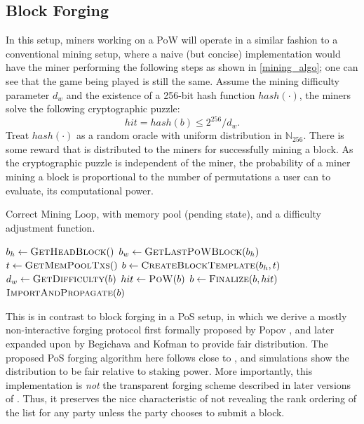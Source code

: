 \documentclass[a4paper]{article}
\begin{document}
\subsection{Block Forging}

In this setup, miners working on a PoW will operate in a similar fashion to a conventional mining setup, where a naive (but concise) implementation would have the miner performing the following steps as shown in \cref{mining_algo}; one can see that the game being played is still the same. Assume the mining difficulty parameter $d_w$ and the existence of a 256-bit hash function $hash(\cdot)$, the miners solve the following cryptographic puzzle:
\begin{equation}
hit = hash(b) \leq 2^{256} / d_w.
\end{equation}
Treat $hash(\cdot)$ as a random oracle with uniform distribution in $\mathbb{N}_{256}$. There is some reward that is distributed to the miners for successfully mining a block. As the cryptographic puzzle is independent of the miner, the probability of a miner mining a block is proportional to the number of permutations a user can to evaluate, its computational power.

\begin{algorithm}
    \caption{Correct Mining Loop, with memory pool (pending state), and a difficulty adjustment function.}
    \label{mining_algo}
    \begin{algorithmic}[1]
        \State $b_h \gets \Call{GetHeadBlock}$
        \State $b_w \gets \Call{GetLastPoWBlock}{b_h}$
        \State $t   \gets \Call{GetMemPoolTxs}$
        \State $b   \gets \Call{CreateBlockTemplate}{b_h, t}$
        \State $d_w \gets \Call{GetDifficulty}{b}$
        \Do
            \State $hit \gets \Call{PoW}{b}$
        \State $b   \gets \Call{Finalize}{b, hit}$
        \State $\Call{ImportAndPropagate}{b}$
        \EndProcedure
  \end{algorithmic}
\end{algorithm}

This is in contrast to block forging in a PoS setup, in which we derive a mostly non-interactive forging protocol first formally proposed by Popov \cite{popov2016probabilistic}, and later expanded upon by Begichava and Kofman \cite{begichava2018} to provide fair distribution. The proposed PoS forging algorithm here follows close to \cite{begichava2018}, and simulations show the distribution to be fair relative to staking power. More importantly, this implementation is \textit{not} the transparent forging scheme described in later versions of \cite{popov2016probabilistic}. Thus, it preserves the nice characteristic of not revealing the rank ordering of the list for any party unless the party chooses to submit a block.
\end{document}
